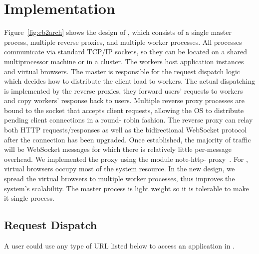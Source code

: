 \chapter{Implementation}
\label{ch:impl}

\newarchitectureoverview{}

Figure~\ref{fig:cb2arch} shows the design of \cbtwo, which consists of a
single master process, multiple reverse proxies, and multiple worker
processes. All processes communicate via standard TCP/IP sockets, so they can
be located on a shared multiprocessor machine or in a cluster. The workers
host application instances and virtual browsers. The master is responsible for
the request dispatch logic which decides how to distribute the client load to
workers. The actual dispatching is implemented by the reverse proxies, they
forward users' requests to workers and copy workers' response back to users.
Multiple reverse proxy processes are bound to the socket that accepts client
requests, allowing the OS to distribute pending client connections in a round-
robin fashion. The reverse proxy can relay both HTTP requests/responses as
well as the bidirectional WebSocket protocol after the connection has been
upgraded.  Once established, the majority of traffic will be WebSocket
messages for which there is relatively little per-message overhead.  We
implemented the proxy using the \nodejs{} module note-http-
proxy~\cite{nodeproxy}. For \cb, virtual browsers occupy most of the system
resource. In the new design, we spread the virtual
browsers to multiple worker processes, thus improves the system's scalability.
The master process is light weight so it is tolerable to make it single process.



\section{Request Dispatch}
\label{sec:reqdis}

A user could use any type of URL listed below to access an application in
\cb{}.

